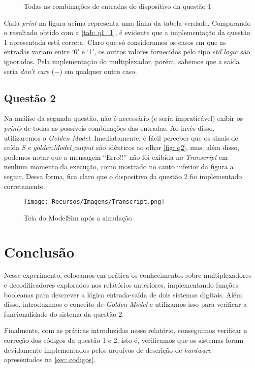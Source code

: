 \documentclass[a4paper,12pt]{article}
\begin{document}
\begin{figure}[H]
    \centering
    
    \caption{Todas as combinações de entradas do dispositivo da questão 1}
    \label{fig:enter-label}
\end{figure}

Cada \textit{print} na figura acima representa uma linha da tabela-verdade. Comparando o resultado obtido com a \autoref{tab: q1_1}, é evidente que a implementação da questão 1 apresentada está correta. Claro que só consideramos os casos em que as entradas variam entre `0' e `1', os outros valores fornecidos pelo tipo $std\_logic$ são ignorados. Pela implementação do multiplexador, porém, sabemos que a saída seria \textit{don't care} ($-$) em qualquer outro caso.

\subsection{Questão 2}
Na análise da segunda questão, não é necessário (e seria impraticável) exibir os \textit{prints} de todas as possíveis combinações das entradas. Ao invés disso, utilizaremos o \textit{Golden Model}. 
Imediatamente, é fácil perceber que os sinais de saída $S$ e $goldenModel\_output$ são idênticos ao olhar \autoref{fig: q2}, mas, além disso, podemos notar que a mensagem ``Erro!!'' não foi exibida no \textit{Transcript} em nenhum momento da execução, como mostrado no canto inferior da figura a seguir. Dessa forma, fica claro que o dispositivo da questão 2 foi implementado corretamente.

\begin{figure}[H]
    \centering
    \texttt{[image: Recursos/Imagens/Transcript.png]}
    \caption{Tela do ModelSim após a simulação}
\end{figure}

\section{Conclusão}
Nesse experimento, colocamos em prática os conhecimentos sobre multiplexadores e decodificadores explorados nos relatórios anteriores, implementando funções booleanas para descrever a lógica entrada-saída de dois sistemas digitais. Além disso, introduzimos o conceito de \textit{Golden Model} e utilizamos isso para verificar a funcionalidade do sistema da questão 2.

Finalmente, com as práticas introduzidas nesse relatório, conseguimos verificar a correção dos códigos da questão 1 e 2, isto é, verificamos que os sistemas foram devidamente implementados pelos arquivos de descrição de \textit{hardware} apresentados na \autoref{sec: codigos}.
\end{document}
